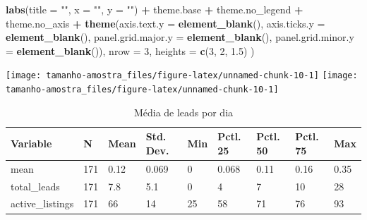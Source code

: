 \documentclass[
]{article}
\newenvironment{Shaded}{\begin{snugshade}}{\end{snugshade}}
\newcommand{\AttributeTok}[1]{\textcolor[rgb]{0.13,0.29,0.53}{#1}}
\newcommand{\DecValTok}[1]{\textcolor[rgb]{0.00,0.00,0.81}{#1}}
\newcommand{\FloatTok}[1]{\textcolor[rgb]{0.00,0.00,0.81}{#1}}
\newcommand{\FunctionTok}[1]{\textcolor[rgb]{0.13,0.29,0.53}{\textbf{#1}}}
\newcommand{\NormalTok}[1]{#1}
\newcommand{\OtherTok}[1]{\textcolor[rgb]{0.56,0.35,0.01}{#1}}
\newcommand{\SpecialCharTok}[1]{\textcolor[rgb]{0.81,0.36,0.00}{\textbf{#1}}}
\newcommand{\StringTok}[1]{\textcolor[rgb]{0.31,0.60,0.02}{#1}}
\begin{document}
\begin{Shaded}
\begin{Highlighting}[]
    \FunctionTok{labs}\NormalTok{(}\AttributeTok{title =} \StringTok{""}\NormalTok{,}
         \AttributeTok{x =} \StringTok{""}\NormalTok{,}
         \AttributeTok{y =} \StringTok{""}\NormalTok{) }\SpecialCharTok{+}
\NormalTok{    theme.base }\SpecialCharTok{+}\NormalTok{ theme.no\_legend }\SpecialCharTok{+}\NormalTok{ theme.no\_axis }\SpecialCharTok{+}
    \FunctionTok{theme}\NormalTok{(}\AttributeTok{axis.text.y =} \FunctionTok{element\_blank}\NormalTok{(),}
          \AttributeTok{axis.ticks.y =} \FunctionTok{element\_blank}\NormalTok{(),}
          \AttributeTok{panel.grid.major.y =} \FunctionTok{element\_blank}\NormalTok{(),}
          \AttributeTok{panel.grid.minor.y =} \FunctionTok{element\_blank}\NormalTok{()),}
  \AttributeTok{nrow =} \DecValTok{3}\NormalTok{,}
  \AttributeTok{heights =} \FunctionTok{c}\NormalTok{(}\DecValTok{3}\NormalTok{, }\DecValTok{2}\NormalTok{, }\FloatTok{1.5}\NormalTok{)}
\NormalTok{)}
\end{Highlighting}
\end{Shaded}

\begin{center}  { \texttt{[image: tamanho-amostra\_files/figure-latex/unnamed-chunk-10-1]} } { \texttt{[image: tamanho-amostra\_files/figure-latex/unnamed-chunk-10-1]} }  \end{center}

\begin{Shaded}
\end{Shaded}

\begin{table}

\caption{\label{tab:unnamed-chunk-11}Média de leads por dia}
\centering
\begin{tabular}[t]{lllllllll}
\toprule
Variable & N & Mean & Std. Dev. & Min & Pctl. 25 & Pctl. 50 & Pctl. 75 & Max\\
\midrule
mean & 171 & 0.12 & 0.069 & 0 & 0.068 & 0.11 & 0.16 & 0.35\\
total\_leads & 171 & 7.8 & 5.1 & 0 & 4 & 7 & 10 & 28\\
active\_listings & 171 & 66 & 14 & 25 & 58 & 71 & 76 & 93\\
\bottomrule
\end{tabular}
\end{table}
\end{document}
